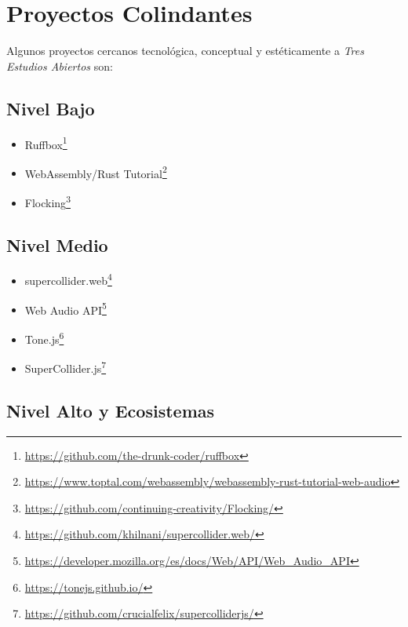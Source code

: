 
\section{Proyectos Colindantes}

Algunos proyectos cercanos tecnológica, conceptual y estéticamente a \emph{Tres Estudios Abiertos} son: 

\subsection{Nivel Bajo}

\begin{itemize}

\item Ruffbox\footnote{\url{https://github.com/the-drunk-coder/ruffbox}}
\item WebAssembly/Rust Tutorial\footnote{\url{https://www.toptal.com/webassembly/webassembly-rust-tutorial-web-audio}}
\item Flocking\footnote{\url{https://github.com/continuing-creativity/Flocking/}}
\end{itemize}

\subsection{Nivel Medio}

\begin{itemize}

\item supercollider.web\footnote{\url{https://github.com/khilnani/supercollider.web/}}
\item Web Audio API\footnote{\url{https://developer.mozilla.org/es/docs/Web/API/Web_Audio_API}}
\item Tone.js\footnote{\url{https://tonejs.github.io/}}
\item SuperCollider.js\footnote{\url{https://github.com/crucialfelix/supercolliderjs/}}
  
\end{itemize}

\subsection{Nivel Alto y Ecosistemas}

